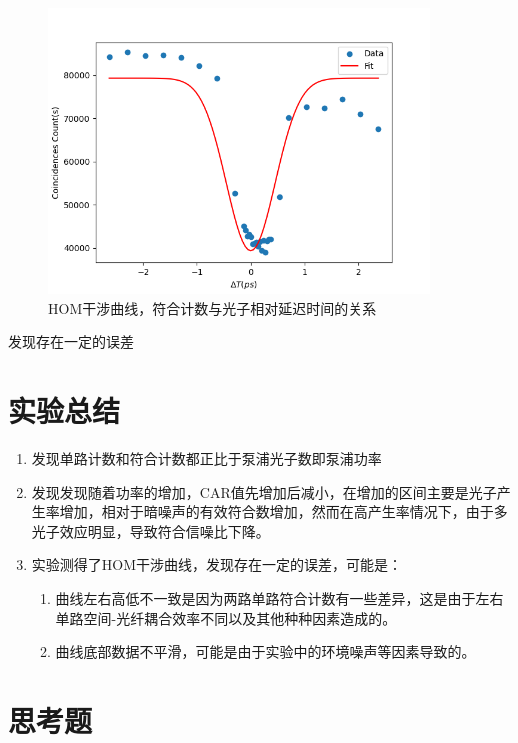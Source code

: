 \documentclass[a4paper,UTF8]{ctexart}
\begin{document}
\begin{figure}[H]
    \centering
    \begin{minipage}[b]{0.9\textwidth}
        \centering
        \includegraphics[width=0.9\textwidth]{./ffig6.png}
        \caption{HOM干涉曲线，符合计数与光子相对延迟时间的关系}
    \end{minipage}
\end{figure}

发现存在一定的误差

\section{实验总结}

\begin{enumerate}
    \item 发现单路计数和符合计数都正比于泵浦光子数即泵浦功率
    \item 发现发现随着功率的增加，CAR值先增加后减小，在增加的区间主要是光子产生率增加，相对于暗噪声的有效符合数增加，然而在高产生率情况下，由于多光子效应明显，导致符合信噪比下降。
    \item 实验测得了HOM干涉曲线，发现存在一定的误差，可能是：
    \begin{enumerate}
        \item 曲线左右高低不一致是因为两路单路符合计数有一些差异，这是由于左右单路空间-光纤耦合效率不同以及其他种种因素造成的。
        \item 曲线底部数据不平滑，可能是由于实验中的环境噪声等因素导致的。
    \end{enumerate}
\end{enumerate}

\section{思考题}
\end{document}
